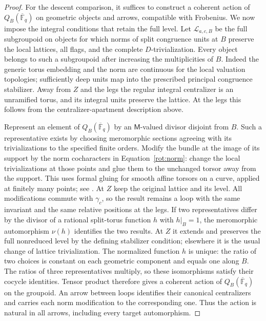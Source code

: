 \begin{proof}
For the descent comparison, it suffices to construct a coherent action
of $Q_B(\overline{\mathbb F}_q)$ on geometric objects and arrows,
compatible with Frobenius.  We now impose the integral conditions that
retain the full level.  Let $\mathcal L_{a,c,B}$ be
the full subgroupoid on objects for which norms of split congruence
units at $B$ preserve the local lattices, all flags, and the complete
$D$-trivialization.  Every object belongs to such a subgroupoid after
increasing the multiplicities of $B$.  Indeed the generic torus
embedding and the norm are continuous for the local valuation
topologies; sufficiently deep units map into the prescribed principal
congruence stabilizer.  Away from $Z$ and the legs the regular integral
centralizer is an unramified torus, and its integral units preserve the
lattice.  At the legs this follows from the centralizer-apartment
description above.

Represent an element of $Q_B(\overline{\mathbb F}_q)$ by an
$\mathsf M$-valued divisor disjoint from $B$.  Such a representative
exists by choosing meromorphic
sections agreeing with its trivializations to the specified finite
orders.  Modify the bundle at the image of its support by the norm
cocharacters in Equation~\eqref{rot:norm}: change the local
trivializations at those points and glue them to the unchanged torsor
away from the support.  This uses formal gluing for smooth affine
torsors on a curve, applied at finitely many points; see
\cite[arXiv version, Section~5.a, Lemma~5.1]{PappasZhu}.
At $Z$ keep the original lattice and its level.
All modifications commute with $\gamma_c$, so the result remains a
loop with the same invariant and the same relative positions at the
legs.  If two representatives differ by the divisor of a rational
split-torus function $h$ with $h|_B=1$, the meromorphic automorphism
$\nu(h)$ identifies the two results.  At $Z$ it extends and preserves
the full nonreduced level by the defining stabilizer condition;
elsewhere it is the usual change of lattice trivialization.
The normalized function $h$ is unique: the ratio of two choices is
constant on each geometric component and equals one along $B$.
The ratios of three representatives multiply, so these isomorphisms
satisfy their cocycle identities.  Tensor product therefore gives a
coherent action of $Q_B(\overline{\mathbb F}_q)$ on the groupoid.
An arrow between loops identifies their canonical centralizers and
carries each norm modification to the corresponding one.  Thus the
action is natural in all arrows, including every target automorphism.


\end{proof}
